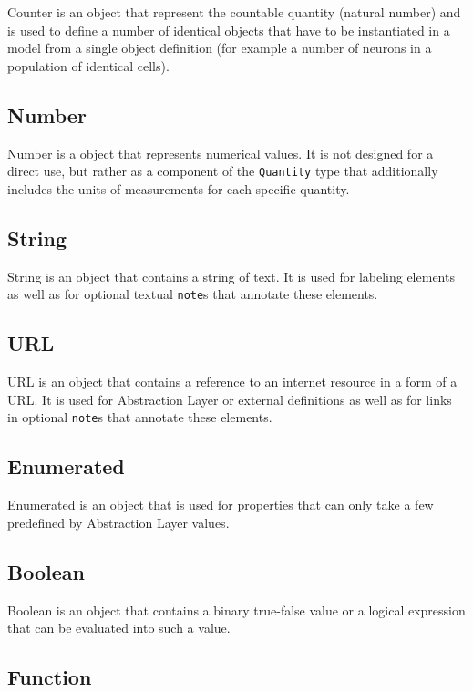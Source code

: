 \documentclass{article}
\begin{document}
Counter is an object that represent the countable quantity (natural
number) and is used to define a number of identical objects that have
to be instantiated in a model from a single object definition (for
example a number of neurons in a population of identical cells).

\subsection{Number}

Number is a object that represents numerical values. It is not designed for
a direct use, but rather as a component of the {\tt Quantity} type that
additionally includes the units of measurements for each specific quantity.

\subsection{String}

String is an object that contains a string of text. It is used for labeling
elements as well as for optional textual {\tt note}s that annotate these
elements.

\subsection{URL}

URL is an object that contains a reference to an internet resource in a form
of a URL. It is used for Abstraction Layer or external definitions as well as
for links in optional {\tt note}s that annotate these elements.

\subsection{Enumerated}

Enumerated is an object that is used for properties that can only take
a few predefined by Abstraction Layer values.

\subsection{Boolean}

Boolean is an object that contains a binary true-false value or a logical
expression that can be evaluated into such a value.

\subsection{Function}
\end{document}
